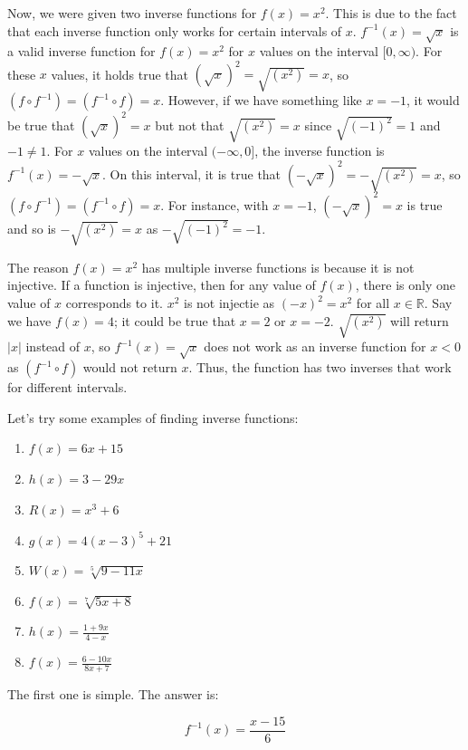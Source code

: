 \documentclass[12pt]{article}
\begin{document}
Now, we were given two inverse functions for $f(x)=x^2$.
This is due to the fact that each inverse function only works for certain intervals of $x$.
$f^{-1}(x)=\sqrt{x}$ is a valid inverse function for $f(x)=x^2$ for $x$ values on the interval $[0, \infty)$.
                For these $x$ values, it holds true that $(\sqrt{x})^2 = \sqrt{(x^2)} = x$, so $(f \circ f^{-1}) = (f^{-1} \circ f) = x$.
                However, if we have something like $x=-1$, it would be true that $(\sqrt{x})^2 = x$ but not that $\sqrt{(x^2)} = x$ since $\sqrt{(-1)^2} = 1$ and $-1 \neq 1$.
                For $x$ values on the interval $(-\infty, 0]$, the inverse function is $f^{-1}(x)=-\sqrt{x}$.
On this interval, it is true that $(-\sqrt{x})^2 = -\sqrt{(x^2)} = x$, so $(f \circ f^{-1}) = (f^{-1} \circ f) = x$.
For instance, with $x=-1$, $(-\sqrt{x})^2 = x$ is true and so is $-\sqrt{(x^2)} = x$ as $-\sqrt{(-1)^2} = -1$.

The reason $f(x)=x^2$ has multiple inverse functions is because it is not injective.
If a function is injective, then for any value of $f(x)$, there is only one value of $x$ corresponds to it.
$x^2$ is not injectie as $(-x)^2 = x^2$ for all $x \in \mathbb{R}$.
Say we have $f(x) = 4$; it could be true that $x=2$ or $x=-2$.
$\sqrt{(x^2)}$ will return $|x|$ instead of $x$, so $f^{-1}(x)=\sqrt{x}$ does not work as an inverse function for $x<0$ as $(f^{-1} \circ f)$ would not return $x$.
Thus, the function has two inverses that work for different intervals.

Let's try some examples of finding inverse functions:

\begin{enumerate}
    \item $f(x) = 6x + 15$
    \item $h(x) = 3 - 29x$
    \item $R(x) = x^3 + 6$
    \item $g(x) = 4(x-3)^5 + 21$
    \item $W(x) = \sqrt[5]{9-11x}$
    \item $f(x) = \sqrt[7]{5x+8}$
    \item $h(x) = \displaystyle \frac{1+9x}{4-x}$
    \item $f(x) = \displaystyle \frac{6-10x}{8x+7}$
\end{enumerate}

The first one is simple.
The answer is:

\begin{equation}
    f^{-1}(x) = \frac{x-15}{6}
\end{equation}
\end{document}
